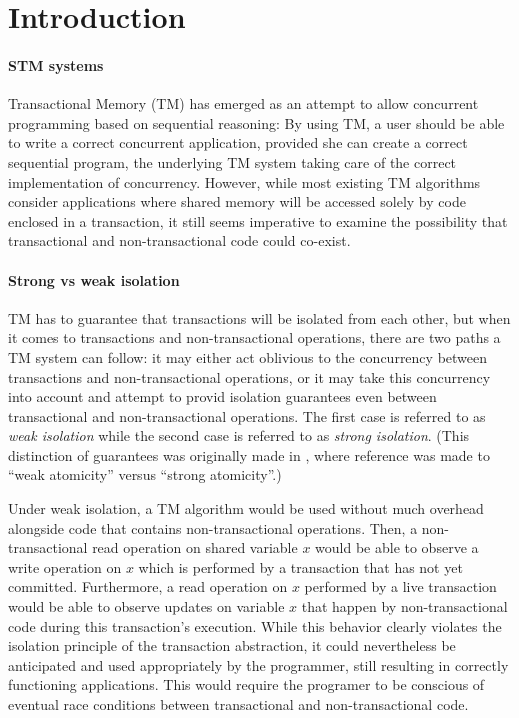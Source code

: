 \documentclass[11pt,letterpaper]{article}
\begin{document}
\section{Introduction}


\paragraph{STM systems}
Transactional Memory (TM) 
\cite{herlihy93, shavit95} 
has  emerged  as  an  attempt  to allow  concurrent  programming  based  on
sequential reasoning:  
By  using  TM,  a  user  should  be able  to  write  a  correct  concurrent
application, provided she can  
create a correct  sequential program, the underlying TM  system taking
care of  the correct  implementation of  concurrency.  However,  while most
existing  TM algorithms consider applications  
where  shared  memory  will  be  accessed  solely by  code  enclosed  in  a
transaction,  it still seems   imperative to  examine the  possibility that
transactional and non-transactional code could co-exist. 



\paragraph{Strong vs weak isolation}
TM has to guarantee that transactions will be isolated from each other, but
when it  comes to transactions and non-transactional  operations, there are
two  paths a  TM system  can follow:  it may  either act  oblivious  to the
concurrency between transactions and non-transactional 
operations, or  it may  take this concurrency  into account and  attempt to
provid     isolation    guarantees    even   between    transactional   and
non-transactional operations. The first  case is  referred to as \emph{weak
isolation} while the second case is referred to as \emph{strong  
isolation}.  (This  distinction  of   guarantees  was  originally  made  in
\cite{blundell06},  where   reference  was  made   to  {}``weak
atomicity'' versus {}``strong atomicity''.) 

Under weak  isolation, a  TM algorithm would  be used without  much overhead
alongside  code    that  contains  non-transactional  operations.  Then,  a
non-transactional read operation  on shared  variable $x$ would  be able to
observe a write operation on $x$ which is performed by a transaction  
that has not yet committed.  Furthermore, a read operation on $x$ performed
by a  live transaction  would  be able to  observe updates on  variable $x$
that   happen   by  non-transactional   code   during  this   transaction's
execution. While this behavior  clearly violates the isolation principle of
the  transaction abstraction, it could nevertheless be anticipated and used
appropriately by the  
programmer,  still resulting  in correctly  functioning  applications. This
would require the programer 
to  be conscious  of  eventual race  conditions  between transactional  and
non-transactional code.  
\end{document}
